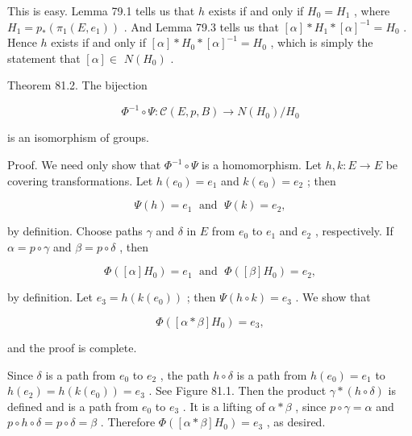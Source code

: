 This is easy. Lemma 79.1 tells us that \(h\) exists if and only if \({H}_{0} = {H}_{1}\) , where \({H}_{1} = {p}_{ * }\left( {{\pi }_{1}\left( {E,{e}_{1}}\right) }\right)\) . And Lemma 79.3 tells us that \(\left\lbrack  \alpha \right\rbrack   * {H}_{1} * {\left\lbrack  \alpha \right\rbrack  }^{-1} = {H}_{0}\) . Hence \(h\) exists if and only if \(\left\lbrack  \alpha \right\rbrack   * {H}_{0} * {\left\lbrack  \alpha \right\rbrack  }^{-1} = {H}_{0}\) , which is simply the statement that \(\left\lbrack  \alpha \right\rbrack   \in\)  \(N\left( {H}_{0}\right)\) .

Theorem 81.2. The bijection

\[
{\Phi }^{-1} \circ  \Psi  : \mathcal{C}\left( {E,p,B}\right)  \rightarrow  N\left( {H}_{0}\right) /{H}_{0}
\]

is an isomorphism of groups.

Proof. We need only show that \({\Phi }^{-1} \circ  \Psi\) is a homomorphism. Let \(h,k : E \rightarrow  E\) be covering transformations. Let \(h\left( {e}_{0}\right)  = {e}_{1}\) and \(k\left( {e}_{0}\right)  = {e}_{2}\) ; then

\[
\Psi \left( h\right)  = {e}_{1}\;\text{ and }\;\Psi \left( k\right)  = {e}_{2},
\]

by definition. Choose paths \(\gamma\) and \(\delta\) in \(E\) from \({e}_{0}\) to \({e}_{1}\) and \({e}_{2}\) , respectively. If \(\alpha  = p \circ  \gamma\) and \(\beta  = p \circ  \delta\) , then

\[
\Phi \left( {\left\lbrack  \alpha \right\rbrack  {H}_{0}}\right)  = {e}_{1}\;\text{ and }\;\Phi \left( {\left\lbrack  \beta \right\rbrack  {H}_{0}}\right)  = {e}_{2},
\]

by definition. Let \({e}_{3} = h\left( {k\left( {e}_{0}\right) }\right)\) ; then \(\Psi \left( {h \circ  k}\right)  = {e}_{3}\) . We show that

\[
\Phi \left( {\left\lbrack  {\alpha  * \beta }\right\rbrack  {H}_{0}}\right)  = {e}_{3},
\]

and the proof is complete.

Since \(\delta\) is a path from \({e}_{0}\) to \({e}_{2}\) , the path \(h \circ  \delta\) is a path from \(h\left( {e}_{0}\right)  = {e}_{1}\) to \(h\left( {e}_{2}\right)  = h\left( {k\left( {e}_{0}\right) }\right)  = {e}_{3}\) . See Figure 81.1. Then the product \(\gamma  * \left( {h \circ  \delta }\right)\) is defined and is a path from \({e}_{0}\) to \({e}_{3}\) . It is a lifting of \(\alpha  * \beta\) , since \(p \circ  \gamma  = \alpha\) and \(p \circ  h \circ  \delta  = p \circ  \delta  = \beta\) . Therefore \(\Phi \left( {\left\lbrack  {\alpha  * \beta }\right\rbrack  {H}_{0}}\right)  = {e}_{3}\) , as desired.

